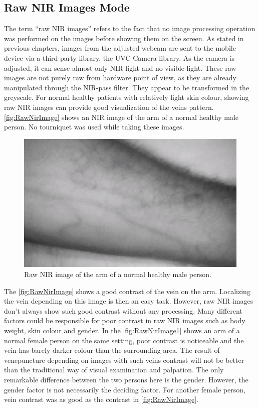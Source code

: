 \subsection{Raw NIR Images Mode}

The term “raw NIR images” refers to the fact that no image processing operation was performed on the images before showing them on the screen. As stated in previous chapters, images from the adjusted webcam are sent to the mobile device via a third-party library, the UVC Camera library. As the camera is adjusted, it can sense almost only NIR light and no visible light. These raw images are not purely raw from hardware point of view, as they are already manipulated through the NIR-pass filter. They appear to be transformed in the greyscale. For normal healthy patients with relatively light skin colour, showing raw NIR images can provide good visualization of the veins pattern. \autoref{fig:RawNirImage} shows an NIR image of the arm of a normal healthy male person. No tourniquet was used while taking these images.


\begin{figure}[H]
\centering
\includegraphics{figures/nir.JPG}
\caption[Raw NIR Image of an Arm with Good Vein Contrast]{Raw NIR image of the arm of a normal healthy male person.}\label{fig:RawNirImage}
\end{figure}

The \autoref{fig:RawNirImage} shows a good contrast of the vein on the arm. Localizing the vein depending on this image is then an easy task. However, raw NIR images don’t always show such good contrast without any processing. Many different factors could be responsible for poor contrast in raw NIR images such as body weight, skin colour and gender.  In the \autoref{fig:RawNirImage1}  shows an arm of a normal female person on the same setting, poor contrast is noticeable and the vein has barely darker colour than the surrounding area.
The result of venepuncture depending on images with such veins contrast will not be better than the traditional way of visual examination and palpation. The only remarkable difference between the two persons here is the gender. However, the gender factor is not necessarily the deciding factor. For another female person, vein contrast was as good as the contrast in \autoref{fig:RawNirImage}.

